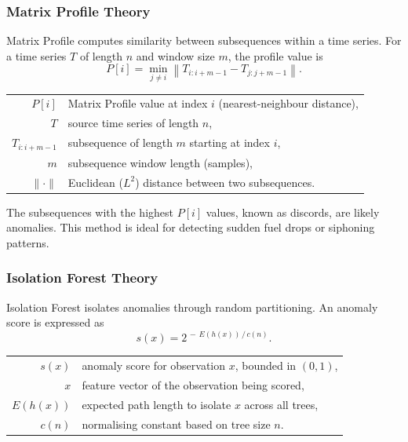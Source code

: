 \subsubsection{Matrix Profile Theory}

Matrix Profile computes similarity between subsequences within a time series. For a time series $T$ of length $n$ and window size $m$, the profile value is
%
\begin{equation}
P[i] = \min_{j \neq i} \left\| T_{i:i+m-1} - T_{j:j+m-1} \right\|.
\label{eq:mp-ch3}
\end{equation}
\begin{tabular}{@{}r@{~=~}l@{}}
$P[i]$ & Matrix Profile value at index $i$ (nearest-neighbour distance), \\
$T$ & source time series of length $n$, \\
$T_{i:i+m-1}$ & subsequence of length $m$ starting at index $i$, \\
$m$ & subsequence window length (samples), \\
$\|\cdot\|$ & Euclidean ($L^{2}$) distance between two subsequences.
\end{tabular}

\vspace{0.5em}
The subsequences with the highest $P[i]$ values, known as discords, are likely anomalies. This method is ideal for detecting sudden fuel drops or siphoning patterns.

\subsubsection{Isolation Forest Theory}

Isolation Forest isolates anomalies through random partitioning. An anomaly score is expressed as
%
\begin{equation}
s(x) = 2^{\,-\,E(h(x))\,/\,c(n)}.
\label{eq:iforest-ch3}
\end{equation}
\begin{tabular}{@{}r@{~=~}l@{}}
$s(x)$ & anomaly score for observation $x$, bounded in $(0,1)$, \\
$x$ & feature vector of the observation being scored, \\
$E(h(x))$ & expected path length to isolate $x$ across all trees, \\
$c(n)$ & normalising constant based on tree size $n$.
\end{tabular}


